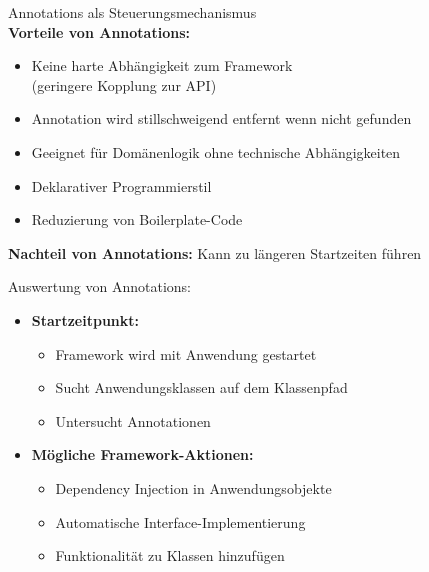 \begin{concept}{Annotations als Steuerungsmechanismus}\\
\textbf{Vorteile von Annotations:}
\begin{itemize}
    \item Keine harte Abhängigkeit zum Framework\\ (geringere Kopplung zur API)
    \item Annotation wird stillschweigend entfernt wenn nicht gefunden
    \item Geeignet für Domänenlogik ohne technische Abhängigkeiten
    \item Deklarativer Programmierstil
    \item Reduzierung von Boilerplate-Code
\end{itemize}

\textbf{Nachteil von Annotations:} Kann zu längeren Startzeiten führen
\end{concept}

\begin{theorem}{Auswertung von Annotations:}
\begin{itemize}
    \item \textbf{Startzeitpunkt:}
    \begin{itemize}
        \item Framework wird mit Anwendung gestartet
        \item Sucht Anwendungsklassen auf dem Klassenpfad
        \item Untersucht Annotationen
    \end{itemize}
    \item \textbf{Mögliche Framework-Aktionen:}
    \begin{itemize}
        \item Dependency Injection in Anwendungsobjekte
        \item Automatische Interface-Implementierung
        \item Funktionalität zu Klassen hinzufügen
    \end{itemize}
\end{itemize}
\end{theorem}

